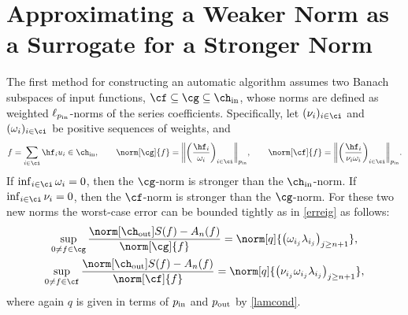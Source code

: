 \documentclass[final]{elsarticle}
\newcommand{\chin}{\ch_{\text{\rm{in}}}}
\newcommand{\chout}{\ch_{\text{\rm{out}}}}
\newcommand{\pin}{p_{\text{\rm{in}}}}
\newcommand{\pout}{p_{\text{\rm{out}}}}
\theoremstyle{definition}
\theoremstyle{remark}
\begin{document}
\section{Approximating a Weaker Norm as a Surrogate for a Stronger Norm}

The first method for constructing an automatic algorithm assumes two Banach subspaces of input functions, $\cf \subseteq \cg \subseteq \chin$, whose norms are defined as weighted $\ell_{\pin}$-norms of the series coefficients.  Specifically, let $(\nu_i)_{i \in \ci}$ and $(\omega_i)_{i \in \ci}$ be positive sequences of weights, and
\begin{equation*}
f = \sum_{i \in \ci} \hf_i u_i \in \chin, \qquad \norm[\cg]{f}=\bigg\lVert\bigg(\frac{\hf_i}{\omega_i}\bigg)_{i\in \ci}\bigg\rVert_{\pin}, \qquad \norm[\cf]{f}=\bigg\lVert\bigg(\frac{\hf_i}{\nu_i\omega_i}\bigg)_{i\in \ci}\bigg\rVert_{\pin}.
\end{equation*}
If $\inf_{i \in \ci} \omega_i = 0$, then the $\cg$-norm is stronger than the $\chin$-norm.  If $\inf_{i \in \ci} \nu_i = 0$, then the $\cf$-norm is stronger than the $\cg$-norm.
For these two new norms the worst-case error can be bounded tightly as in \eqref{erreig} as follows:
\begin{gather}
\nonumber \label{erreigweakG}
\sup_{0 \ne f \in \cg}\frac{\norm[\chout]{S(f)-A_n(f)}}{\norm[\cg]{f}} = \norm[q]{\left(\omega_{i_j} \lambda_{i_j} \right)_{j\ge n+1}}, \\
\label{erreigweakF}
\sup_{0 \ne f \in \cf}\frac{\norm[\chout]{S(f)-A_n(f)}}{\norm[\cf]{f}} = \norm[q]{\left(\nu_{i_j} \omega_{i_j} \lambda_{i_j} \right)_{j\ge n+1}},
\end{gather}
where again $q$ is given in terms of $\pin$ and $\pout$ by \eqref{lamcond}.
\end{document}
